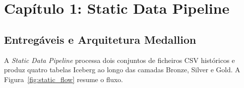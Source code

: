\documentclass[11pt,a4paper]{article}
\begin{document}
\section{Capítulo 1: Static Data Pipeline}

\subsection{Entregáveis e Arquitetura Medallion}

A \textit{Static Data Pipeline} processa dois conjuntos de ficheiros CSV históricos e produz quatro tabelas Iceberg ao longo das camadas Bronze, Silver e Gold. A Figura~\ref{fig:static_flow} resume o fluxo.
\end{document}
